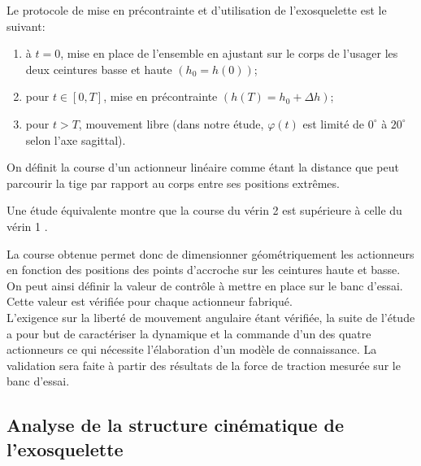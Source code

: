 Le protocole de mise en précontrainte et d'utilisation de l'exosquelette est le suivant:

\begin{enumerate}
  \item à $t=0$, mise en place de l'ensemble en ajustant sur le corps de l'usager les deux ceintures basse et haute $\left(h_{0}=h(0)\right)$;
  \item pour $t \in[0, T]$, mise en précontrainte $\left(h(T)=h_{0}+\Delta h\right)$;
  \item pour $t>T$, mouvement libre (dans notre étude, $\varphi(t)$ est limité de $0^{\circ}$ à $20^{\circ}$ selon l'axe sagittal).
\end{enumerate}

On définit la course d'un actionneur linéaire comme étant la distance que peut parcourir la tige par rapport au corps entre ses positions extrêmes.\\

\ifprof
\begin{corrige}
\end{corrige}
\else
\fi


Une étude équivalente montre que la course du vérin 2 est supérieure à celle du vérin 1 .

La course obtenue permet donc de dimensionner géométriquement les actionneurs en fonction des positions des points d'accroche sur les ceintures haute et basse. On peut ainsi définir la valeur de contrôle à mettre en place sur le banc d'essai. Cette valeur est vérifiée pour chaque actionneur fabriqué.\\
L'exigence sur la liberté de mouvement angulaire étant vérifiée, la suite de l'étude a pour but de caractériser la dynamique et la commande d'un des quatre actionneurs ce qui nécessite l'élaboration d'un modèle de connaissance. La validation sera faite à partir des résultats de la force de traction mesurée sur le banc d'essai.


\subsection{Analyse de la structure cinématique de l'exosquelette} %


